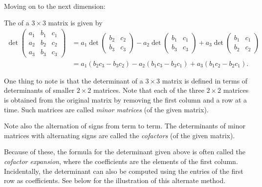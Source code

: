 \documentclass{ximera}
\begin{document}
Moving on to the next dimension:
\begin{definition}
  The  of a $3 \times 3$ matrix is given by
  \begin{align*}
    \det\begin{pmatrix}
      a_1 &  b_1 & c_1 \\
      a_2 &  b_2 & c_2 \\
      a_3 &  b_3 & c_3
    \end{pmatrix}
    & =
      a_1 \det
      \begin{pmatrix}
        b_2 & c_2 \\
        b_3 & c_3
      \end{pmatrix}
      - a_2 \det
      \begin{pmatrix}
        b_1 & c_1 \\
        b_3 & c_3
      \end{pmatrix}
      + a_3 \det
      \begin{pmatrix}
        b_1 & c_1 \\
        b_2 & c_2
      \end{pmatrix} \\
          & = a_1(b_2c_3 - b_3c_2) - a_2(b_1c_3 - b_3c_1) + a_3(b_1c_2 - b_2c_1).
  \end{align*}
\end{definition}


One thing to note is that the determinant of a $3 \times 3$ matrix is
defined in terms of determinants of smaller $2 \times 2$ matrices. Note
that each of the three $2 \times 2$ matrices is obtained from the original
matrix by removing the first column and a row at a time. Such matrices
are called \textit{minor matrices} (of the given matrix).

Note also the alternation of signs from term to term. The determinants
of minor matrices with alternating signs are called the \textit{cofactors} (of
the given matrix).

Because of these, the formula for the determinant given above is often
called the \textit{cofactor expansion}, where the coefficients are the
elements of the first column. Incidentally, the determinant can also
be computed using the entries of the first row as coefficients. See
below for the illustration of this alternate method.
\end{document}
